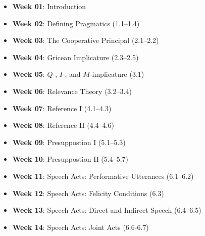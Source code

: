 \documentclass[11pt, a4paper]{article}
\begin{document}
\begin{itemize} \setlength\itemsep{0em}
\item \textbf{Week 01}: Introduction
\item \textbf{Week 02}: Defining Pragmatics (1.1--1.4)
\item \textbf{Week 03}: The Cooperative Principal (2.1--2.2)
\item \textbf{Week 04}: Gricean Implicature (2.3--2.5)
\item \textbf{Week 05}: $Q$-, $I$-, and $M$-implicature (3.1)
\item \textbf{Week 06}: Relevance Theory (3.2--3.4)
\item \textbf{Week 07}: Reference I (4.1--4.3)
\item \textbf{Week 08}: Reference II (4.4--4.6)
\item \textbf{Week 09}: Presuppostion I (5.1--5.3)
\item \textbf{Week 10}: Presuppostion II (5.4--5.7)
\item \textbf{Week 11}: Speech Acts: Performative Utterances (6.1--6.2)
\item \textbf{Week 12}: Speech Acts: Felicity Conditions (6.3)
\item \textbf{Week 13}: Speech Acts: Direct and Indirect Speech (6.4--6.5)
\item \textbf{Week 14}: Speech Acts: Joint Acts (6.6-6.7)
\end{itemize}
\end{document}
